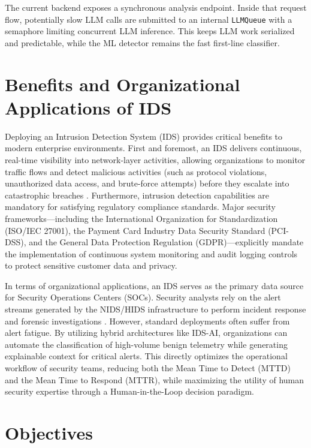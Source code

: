 \documentclass[12pt,a4paper]{report}
\begin{document}
The current backend exposes a synchronous analysis endpoint. Inside that request flow, potentially slow LLM calls are submitted to an internal \texttt{LLMQueue} with a semaphore limiting concurrent LLM inference. This keeps LLM work serialized and predictable, while the ML detector remains the fast first-line classifier.

\section{Benefits and Organizational Applications of IDS}

Deploying an Intrusion Detection System (IDS) provides critical benefits to modern enterprise environments. First and foremost, an IDS delivers continuous, real-time visibility into network-layer activities, allowing organizations to monitor traffic flows and detect malicious activities (such as protocol violations, unauthorized data access, and brute-force attempts) before they escalate into catastrophic breaches \cite{buczak2016}. Furthermore, intrusion detection capabilities are mandatory for satisfying regulatory compliance standards. Major security frameworks—including the International Organization for Standardization (ISO/IEC 27001), the Payment Card Industry Data Security Standard (PCI-DSS), and the General Data Protection Regulation (GDPR)—explicitly mandate the implementation of continuous system monitoring and audit logging controls to protect sensitive customer data and privacy.

In terms of organizational applications, an IDS serves as the primary data source for Security Operations Centers (SOCs). Security analysts rely on the alert streams generated by the NIDS/HIDS infrastructure to perform incident response and forensic investigations \cite{sommer2010}. However, standard deployments often suffer from alert fatigue. By utilizing hybrid architectures like IDS-AI, organizations can automate the classification of high-volume benign telemetry while generating explainable context for critical alerts. This directly optimizes the operational workflow of security teams, reducing both the Mean Time to Detect (MTTD) and the Mean Time to Respond (MTTR), while maximizing the utility of human security expertise through a Human-in-the-Loop decision paradigm.

\section{Objectives}
\end{document}
